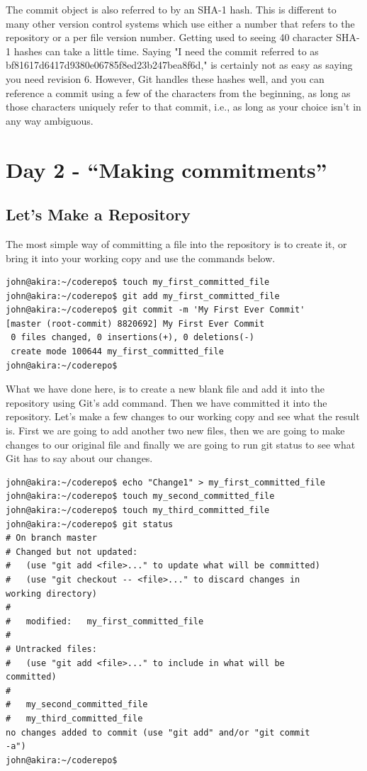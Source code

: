 The commit object is also referred to by an SHA-1 hash.  This is different to many other version control systems which use either a number that refers to the repository or a per file version number.  Getting used to seeing 40 character SHA-1 hashes can take a little time.  Saying "I need the commit referred to as  bf81617d6417d9380e06785f8ed23b247bea8f6d," is certainly not as easy as saying you need revision 6.  However, Git handles these hashes well, and you can reference a commit using a few of the characters from the beginning, as long as those characters uniquely refer to that commit, i.e., as long as your choice isn't in any way ambiguous.

\section{Day 2 - ``Making commitments''}
\subsection{Let's Make a Repository}

The most simple way of committing a file into the repository is to create it, or bring it into your working copy and use the commands below.

\begin{Verbatim}[frame=leftline,framerule=1mm,fontsize=\relsize{-3}] 
john@akira:~/coderepo$ touch my_first_committed_file
john@akira:~/coderepo$ git add my_first_committed_file
john@akira:~/coderepo$ git commit -m 'My First Ever Commit'
[master (root-commit) 8820692] My First Ever Commit
 0 files changed, 0 insertions(+), 0 deletions(-)
 create mode 100644 my_first_committed_file
john@akira:~/coderepo$
\end{Verbatim} 

What we have done here, is to create a new blank file and add it into the repository using Git's add command.  Then we have committed it into the repository.  Let's make a few changes to our working copy and see what the result is.  First we are going to add another two new files, then we are going to make changes to our original file and finally we are going to run git status to see what Git has to say about our changes.

\begin{Verbatim}[frame=leftline,framerule=1mm,fontsize=\relsize{-3}] 
john@akira:~/coderepo$ echo "Change1" > my_first_committed_file 
john@akira:~/coderepo$ touch my_second_committed_file
john@akira:~/coderepo$ touch my_third_committed_file
john@akira:~/coderepo$ git status
# On branch master
# Changed but not updated:
#   (use "git add <file>..." to update what will be committed)
#   (use "git checkout -- <file>..." to discard changes in 
working directory)
#
#	modified:   my_first_committed_file
#
# Untracked files:
#   (use "git add <file>..." to include in what will be 
committed)
#
#	my_second_committed_file
#	my_third_committed_file
no changes added to commit (use "git add" and/or "git commit 
-a")
john@akira:~/coderepo$ 
\end{Verbatim} 

